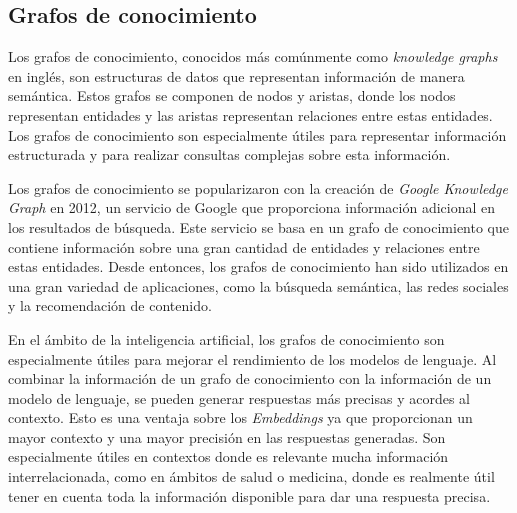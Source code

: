 \subsection{Grafos de conocimiento}
Los grafos de conocimiento, conocidos más comúnmente como \textit{knowledge graphs} en inglés, son estructuras de datos que representan información de manera semántica. Estos grafos se componen de nodos y aristas, donde los nodos representan entidades y las aristas representan relaciones entre estas entidades. Los grafos de conocimiento son especialmente útiles para representar información estructurada y para realizar consultas complejas sobre esta información.

Los grafos de conocimiento se popularizaron con la creación de \textit{Google Knowledge Graph} en 2012, un servicio de Google que proporciona información adicional en los resultados de búsqueda. Este servicio se basa en un grafo de conocimiento que contiene información sobre una gran cantidad de entidades y relaciones entre estas entidades. Desde entonces, los grafos de conocimiento han sido utilizados en una gran variedad de aplicaciones, como la búsqueda semántica, las redes sociales y la recomendación de contenido.

En el ámbito de la inteligencia artificial, los grafos de conocimiento son especialmente útiles para mejorar el rendimiento de los modelos de lenguaje. Al combinar la información de un grafo de conocimiento con la información de un modelo de lenguaje, se pueden generar respuestas más precisas y acordes al contexto. Esto es una ventaja sobre los \textit{Embeddings} ya que proporcionan un mayor contexto y una mayor precisión en las respuestas generadas. Son especialmente útiles en contextos donde es relevante mucha información interrelacionada, como en ámbitos de salud o medicina, donde es realmente útil tener en cuenta toda la información disponible para dar una respuesta precisa.